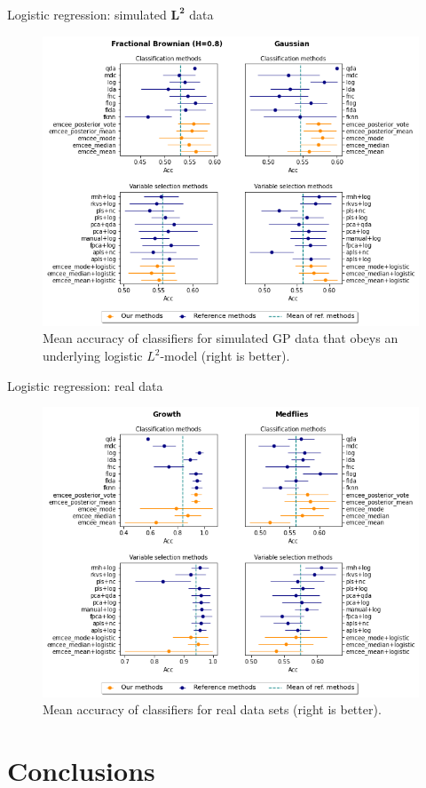 \documentclass[10pt, english, professionalfonts]{beamer}
\begin{document}
\begin{frame}{Logistic regression: simulated \(\bm{L^2}\) data}
    \vspace{1em}
  \begin{figure}
    \includegraphics[width=.75\textwidth]{img/clf_emcee_l2}
    \caption{Mean accuracy of classifiers for simulated GP data that obeys an underlying logistic \(L^2\)-model (right is better).}
  \end{figure}
\end{frame}

\begin{frame}{Logistic regression: real data}
    \vspace{1em}
  \begin{figure}
    \includegraphics[width=.75\textwidth]{img/clf_emcee_real}
    \caption{Mean accuracy of classifiers for real data sets (right is better).}
  \end{figure}
\end{frame}


\section{Conclusions}
\end{document}
